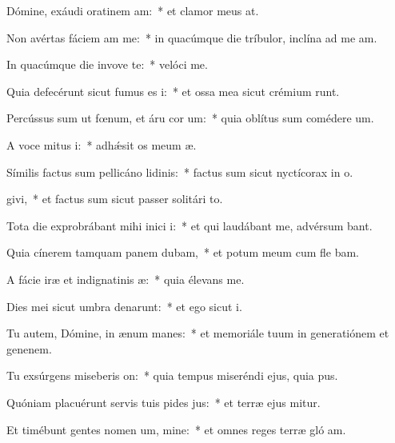 \item Dómine, exáudi oratinem am:~* et clamor meus   at.
\item Non avértas fáciem am  me:~* in quacúmque die tríbulor, inclína ad me  am.
\item In quacúmque die invove te:~* velóci  me.
\item Quia defecérunt sicut fumus es i:~* et ossa mea sicut crémium runt.
\item Percússus sum ut fœnum, et áru cor um:~* quia oblítus sum comédere  um.
\item A voce mitus i:~* adhǽsit os meum  æ.
\item Símilis factus sum pellicáno lidinis:~* factus sum sicut nyctícorax in o.
\item {}givi,~* et factus sum sicut passer solitári  to.
\item Tota die exprobrábant mihi inici i:~* et qui laudábant me, advérsum  bant.
\item Quia cínerem tamquam panem dubam,~* et potum meum cum fle bam.
\item A fácie iræ et indignatinis æ:~* quia élevans  me.
\item Dies mei sicut umbra denarunt:~* et ego sicut  i.
\item Tu autem, Dómine, in ænum manes:~* et memoriále tuum in generatiónem et genenem.
\item Tu exsúrgens miseberis on:~* quia tempus miseréndi ejus, quia  pus.
\item Quóniam placuérunt servis tuis pides jus:~* et terræ ejus mitur.
\item Et timébunt gentes nomen um, mine:~* et omnes reges terræ gló am.
